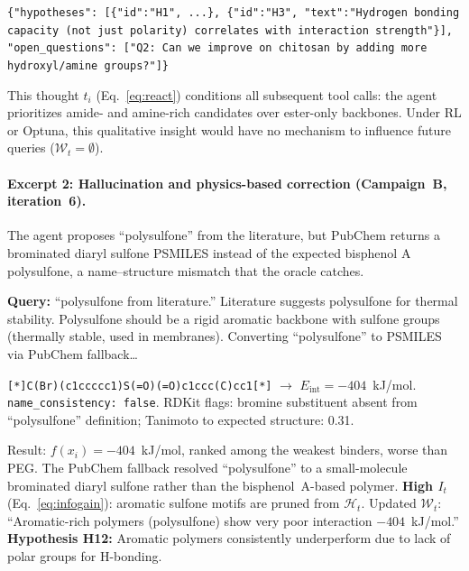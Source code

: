 \documentclass[twocolumn]{fairmeta}
\begin{document}
\begin{toolcall}
\scriptsize
\texttt{\{"hypotheses": [\{"id":"H1", ...\}, \{"id":"H3", "text":"Hydrogen bonding capacity (not just polarity) correlates with interaction strength"\}], "open\_questions": ["Q2: Can we improve on chitosan by adding more hydroxyl/amine groups?"]\}}
\end{toolcall}

\noindent This thought $t_i$ (Eq.~\ref{eq:react}) conditions all subsequent tool calls: the agent prioritizes amide- and amine-rich candidates over ester-only backbones.
Under RL or Optuna, this qualitative insight would have no mechanism to influence future queries ($\mathcal{W}_t = \emptyset$).

\paragraph{Excerpt 2: Hallucination and physics-based correction (Campaign~B, iteration~6).}
The agent proposes ``polysulfone'' from the literature, but PubChem returns a brominated diaryl sulfone PSMILES instead of the expected bisphenol A polysulfone, a name--structure mismatch that the oracle catches.

\begin{agentthought}
\scriptsize
\textbf{Query:} ``polysulfone from literature.''
Literature suggests polysulfone for thermal stability.
Polysulfone should be a rigid aromatic backbone with sulfone groups (thermally stable, used in membranes).
Converting ``polysulfone'' to PSMILES via PubChem fallback\ldots
\end{agentthought}

\begin{toolcall}
\scriptsize
\texttt{[*]C(Br)(c1ccccc1)S(=O)(=O)c1ccc(C)cc1[*]} $\to$ $E_\text{int} = -404$~kJ/mol.
\texttt{name\_consistency: false}. RDKit flags: bromine substituent absent from ``polysulfone'' definition; Tanimoto to expected structure: 0.31.
\end{toolcall}

\begin{observation}
\scriptsize
Result: $f(x_i) = -404$~kJ/mol, ranked among the weakest binders, worse than PEG.
The PubChem fallback resolved ``polysulfone'' to a small-molecule brominated diaryl sulfone rather than the bisphenol~A-based polymer.
\textbf{High $I_t$} (Eq.~\ref{eq:infogain}): aromatic sulfone motifs are pruned from $\mathcal{H}_t$.
Updated $\mathcal{W}_t$: ``Aromatic-rich polymers (polysulfone) show very poor interaction $-404$~kJ/mol.''
\textbf{Hypothesis H12:} Aromatic polymers consistently underperform due to lack of polar groups for H-bonding.
\end{observation}
\end{document}
